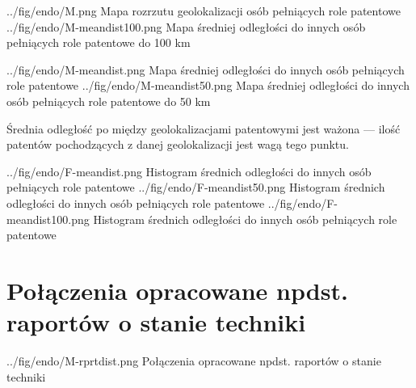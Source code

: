 \figsides
  {../fig/endo/M.png}
    {Mapa rozrzutu geolokalizacji osób pełniących role patentowe}
  {../fig/endo/M-meandist100.png}
    {Mapa średniej odległości do innych osób pełniących role patentowe do 100 km}

\figsides
  {../fig/endo/M-meandist.png}
    {Mapa średniej odległości do innych osób pełniących role patentowe}
  {../fig/endo/M-meandist50.png}
    {Mapa średniej odległości do innych osób pełniących role patentowe do 50 km}

\newpage
{}
{
  \begin{uwaga}
  Średnia odległość po między geolokalizacjami patentowymi jest ważona ---
  ilość patentów pochodzących z danej geolokalizacji jest wagą tego punktu.
  \end{uwaga}
}

\figsidesTri
  {../fig/endo/F-meandist.png}
    {Histogram średnich odległości do innych osób pełniących role patentowe}
  {../fig/endo/F-meandist50.png}
    {Histogram średnich odległości do innych osób pełniących role patentowe}
  {../fig/endo/F-meandist100.png}
    {Histogram średnich odległości do innych osób pełniących role patentowe}



\newpage

\section{Połączenia opracowane npdst. raportów o stanie techniki}

  {../fig/endo/M-rprtdist.png}
    {Połączenia opracowane npdst. raportów o stanie techniki}

